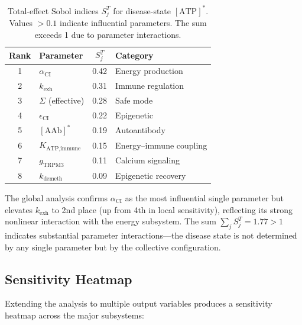 \begin{table}[htbp]
\centering
\caption{Total-effect Sobol indices $S_j^T$ for disease-state $[\text{ATP}]^*$. Values $> 0.1$ indicate influential parameters. The sum exceeds 1 due to parameter interactions.}
\label{tab:sobol-indices}
\begin{tabular}{clcl}
\hline
Rank & Parameter & $S_j^T$ & Category \\
\hline
1 & $\alpha_{\text{CI}}$ & 0.42 & Energy production \\
2 & $k_{\text{exh}}$ & 0.31 & Immune regulation \\
3 & $\Sigma$ (effective) & 0.28 & Safe mode \\
4 & $\epsilon_{\text{CI}}$ & 0.22 & Epigenetic \\
5 & $[\text{AAb}]^*$ & 0.19 & Autoantibody \\
6 & $K_{\text{ATP,immune}}$ & 0.15 & Energy--immune coupling \\
7 & $g_{\text{TRPM3}}$ & 0.11 & Calcium signaling \\
8 & $k_{\text{demeth}}$ & 0.09 & Epigenetic recovery \\
\hline
\end{tabular}
\end{table}

The global analysis confirms $\alpha_{\text{CI}}$ as the most influential single parameter but elevates $k_{\text{exh}}$ to 2nd place (up from 4th in local sensitivity), reflecting its strong nonlinear interaction with the energy subsystem. The sum $\sum_j S_j^T = 1.77 > 1$ indicates substantial parameter interactions---the disease state is not determined by any single parameter but by the collective configuration.

\subsection{Sensitivity Heatmap}

Extending the analysis to multiple output variables produces a sensitivity heatmap across the major subsystems:

